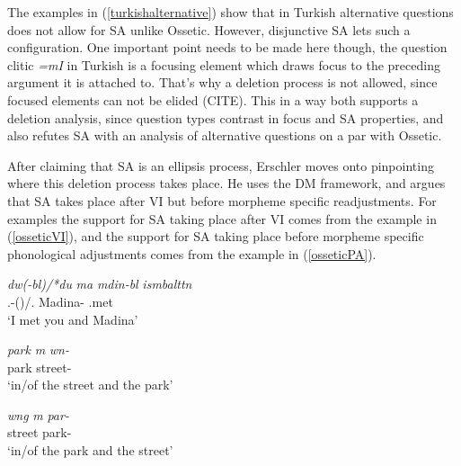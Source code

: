 The examples in (\ref{turkishalternative}) show that in Turkish alternative questions does not allow for SA unlike Ossetic. However, disjunctive SA lets such a configuration. One important point needs to be made here though, the question clitic \textit{=mI} in Turkish is a focusing element which draws focus to the preceding argument it is attached to. That's why a deletion process is not allowed, since focused elements can not be elided (CITE). This in a way both supports a deletion analysis, since question types contrast in focus and SA properties, and also refutes SA with an analysis of alternative questions on a par with Ossetic.

After claiming that SA is an ellipsis process, Erschler moves onto pinpointing where this deletion process takes place. He uses the DM framework, and argues that SA takes place after VI but before morpheme specific readjustments. For examples the support for SA taking place after VI comes from the example in (\ref{osseticVI}), and the support for SA taking place before morpheme specific phonological adjustments comes from the example in (\ref{osseticPA}).

\begin{exe}

    \ex \begin{xlist}
    \ex \label{osseticVI}
    \gll 
    \textit{d\textturna w(-b\textturna l)/*du} \textit{\textturna ma} \textit{m\textturna din\textturna-b\textturna l} \textit{is\textturna mbaltt\textturna n} \\ {\Second}{\Sg}.{\Obl}-({\Sup})/{\Second}{\Sg}.{\Nom} {\And} Madina-{\Sup} {\First}{\Sg}.met \\
    \glt `I met you and Madina'
    
    \ex \label{osseticPA}
    \begin{xlisti}
    \ex
    \gll 
    \textit{park} \textit{\textturna m\textturna} \textit{w\textschwa n\textdyoghlig-\textschwa} \\ park {\And} street-{\Obl} \\
    \glt `in/of the street and the park'
    
    \ex 
    \gll 
    \textit{w\textschwa ng} \textit{\textturna m\textturna} \textit{par\textteshlig-\textschwa} \\ street {\And} park-{\Obl} \\
    \glt `in/of the park and the street'
    \end{xlisti}
    \end{xlist}
\end{exe}

